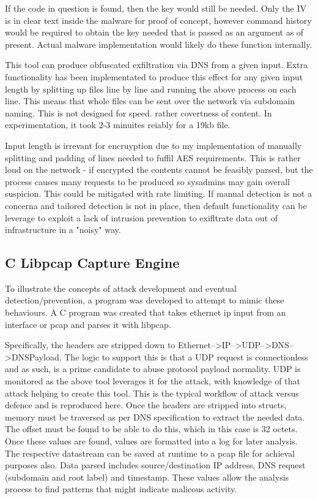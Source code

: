 If the code in question is found, then the key would still be needed. Only the IV is in clear text inside the malware for proof of concept, however command history would be required to obtain the key needed that is passed as an argument as of present. 
Actual malware implementation would likely do these function internally. 


This tool can produce obfuscated exfiltration via DNS from a given input. Extra functionality has been implementated to produce this effect for any given input length by splitting up files line by line and running the above process on each line. This means that whole files can be sent over the network via subdomain naming. This is not designed for speed. rather covertness of content. 
In experimentation, it took 2-3 minuites reiably for a 19kb file. 

Input length is irrevant for encruyption due to my implementation of manually splitting and padding of lines needed to fuffil AES requirements. This is rather loud on the network - if encrypted the contents cannot be feasibly parsed, but the process causes many requests to be produced so sysadmins may gain overall suspicion.
This could be mitigated with rate limiting. If manual detection is not a concerna and tailored detection is not in place, then default functionality can be leverage to exploit a lack of intrusion prevention to exifltrate data out of infrastructure in a "noisy" way.


\subsection{C Libpcap Capture Engine}
To illustrate the concepts of attack development and eventual detection/prevention, a program was developed to attempt to mimic these behaviours. A C program was created that takes ethernet ip input from an interface or pcap and parses it with libpcap.

Specifically, the headers are stripped down to Ethernet-->IP-->UDP-->DNS-->DNSPayload. The logic to support this is that a UDP request is connectionless and as such, is a prime candidate to abuse protocol payload normality. UDP is monitored as the above tool leverages it for the attack, with knowledge of that attack helping to create this tool. This is the typical workflow of attack versus defence and is reproduced here.
Once the headers are stripped into structs, memory must be traversed as per DNS specification to extract the needed data. The offset must be found to be able to do this, which in this case is 32 octets. Once these values are found, values are formatted into a log for later analysis. The respective datastream can be saved at runtime to a pcap file for achieval purposes also. Data parsed includes source/destination IP address, DNS request (subdomain and root label)
and timestamp. These values allow the analysis process to find patterns that might indicate malicous activity.

